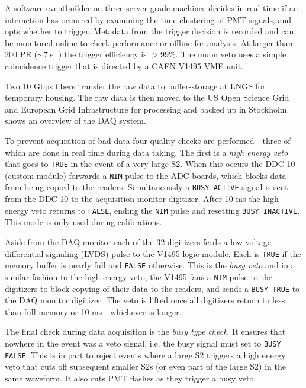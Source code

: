 A software eventbuilder on three server-grade machines decides in real-time if an interaction has occurred by examining the
time-clustering of PMT signals, and opts whether to trigger.  Metadata from the trigger decision is recorded and can be monitored
online to check performance or offline for analysis.  At larger than 200 PE (${\sim}7\ e^-$) the trigger efficiency is $> 99\%$.  The muon
veto uses a simple coincidence trigger that is directed by a CAEN V1495 VME unit.

Two 10 Gbps fibers transfer the raw data to buffer-storage at LNGS for temporary housing.  The raw data is then moved to the US Open
Science Grid and European Grid Infrastructure for processing and backed up in Stockholm.   shows an
overview of the DAQ system.

To prevent acquisition of bad data four quality checks are performed - three of which are done in real time during data taking.  The
first is a \textit{high energy veto} that goes to \texttt{TRUE} in the event of a very large S2.  When this occurs the DDC-10 (custom
module) forwards a \texttt{NIM} pulse to the ADC boards, which blocks data from being copied to the readers.  Simultaneously a
\texttt{BUSY ACTIVE} signal is sent from the DDC-10 to the
acquisition monitor digitizer.  After 10 ms the high energy veto returns to \texttt{FALSE}, ending the \texttt{NIM} pulse and resetting
\texttt{BUSY INACTIVE}.  This mode is only used during calibrations.

Aside from the DAQ monitor each of the 32 digitizers feeds a low-voltage differential signaling (LVDS) pulse to the V1495 logic
module.  Each
is \texttt{TRUE} if the memory buffer is nearly full and \texttt{FALSE} otherwise.  This is the \textit{busy veto} and in a
similar fashion to the high energy veto,
the V1495 fans a \texttt{NIM} pulse to the digitizers to block copying of their data to the readers, and sends a \texttt{BUSY TRUE} to the
DAQ monitor digitizer.  The veto is lifted once all digitizers return to less than full memory or 10 ms - whichever is longer.

The final check during data acquisition is the \textit{busy type check}.  It ensures that nowhere in the event was a veto
signal, i.e. the busy signal must set to \texttt{BUSY FALSE}.  This is in part to reject events where a large S2 triggers a high energy
veto that cuts off subsequent smaller S2s (or even part of the large S2) in the same waveform.  It also cuts PMT flashes as they
trigger a busy veto.

